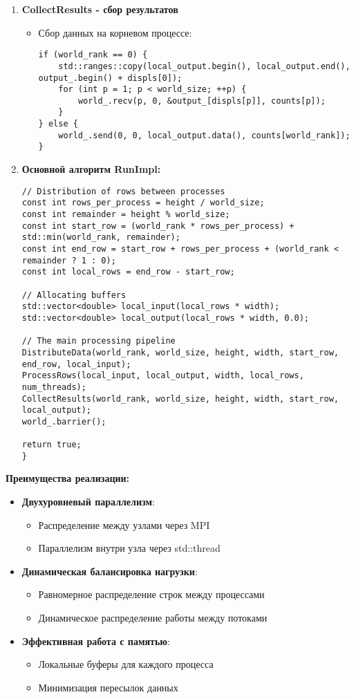 \documentclass[12pt]{article}
\begin{document}
\begin{enumerate}
\item \textbf{CollectResults - сбор результатов}
\begin{itemize}
\item Сбор данных на корневом процессе:
\begin{lstlisting}
if (world_rank == 0) {
    std::ranges::copy(local_output.begin(), local_output.end(), output_.begin() + displs[0]);
    for (int p = 1; p < world_size; ++p) {
        world_.recv(p, 0, &output_[displs[p]], counts[p]);
    }
} else {
    world_.send(0, 0, local_output.data(), counts[world_rank]);
}
\end{lstlisting}
\end{itemize}


\item \textbf{Основной алгоритм RunImpl:}

\begin{lstlisting}
// Distribution of rows between processes
const int rows_per_process = height / world_size;
const int remainder = height % world_size;
const int start_row = (world_rank * rows_per_process) + std::min(world_rank, remainder);
const int end_row = start_row + rows_per_process + (world_rank < remainder ? 1 : 0);
const int local_rows = end_row - start_row;

// Allocating buffers
std::vector<double> local_input(local_rows * width);
std::vector<double> local_output(local_rows * width, 0.0);

// The main processing pipeline
DistributeData(world_rank, world_size, height, width, start_row, end_row, local_input);
ProcessRows(local_input, local_output, width, local_rows, num_threads);
CollectResults(world_rank, world_size, height, width, start_row, local_output);
world_.barrier();

return true;
}
\end{lstlisting}
\end{enumerate}
\textbf{Преимущества реализации:}

\begin{itemize}
\item \textbf{Двухуровневый параллелизм}:
\begin{itemize}
\item Распределение между узлами через MPI
\item Параллелизм внутри узла через std::thread
\end{itemize}

\item \textbf{Динамическая балансировка нагрузки}:
\begin{itemize}
\item Равномерное распределение строк между процессами
\item Динамическое распределение работы между потоками
\end{itemize}

\item \textbf{Эффективная работа с памятью}:
\begin{itemize}
\item Локальные буферы для каждого процесса
\item Минимизация пересылок данных
\end{itemize}
\end{itemize}
\end{document}
